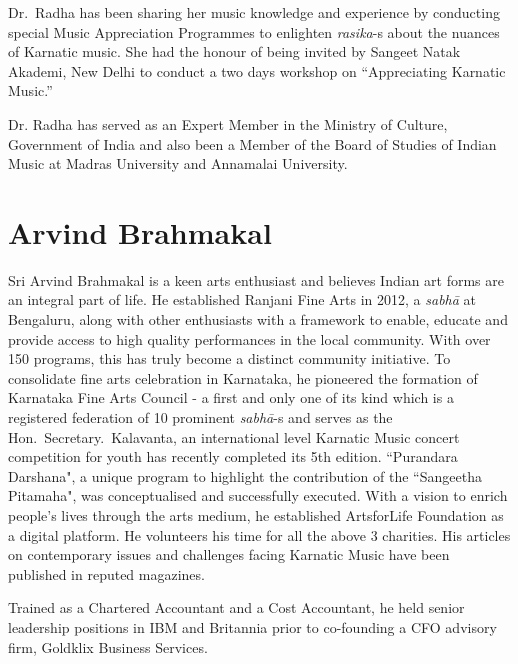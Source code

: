 Dr.~Radha has been sharing her music knowledge and experience by conducting special Music Appreciation Programmes to enlighten \textit{rasika}-s about the nuances of Karnatic music. She had the honour of being invited by Sangeet Natak Akademi, New Delhi to conduct a two days workshop on “Appreciating Karnatic Music.”

Dr. Radha has served as an Expert Member in the Ministry of Culture, Government of India and also been a Member of the Board of Studies of Indian Music at Madras University and Annamalai University.

\vspace{-.3cm}

\section*{Arvind Brahmakal}

\vspace{-.2cm}

Sri Arvind Brahmakal is a keen arts enthusiast and believes Indian art forms are an integral part of life. He established Ranjani Fine Arts in 2012, a \textit{sabhā} at Bengaluru, along with other enthusiasts with a framework to enable, educate and provide access to high quality performances in the local community. With over 150 programs, this has truly become a distinct community initiative. To consolidate fine arts celebration in Karnataka, he pioneered the formation of Karnataka Fine Arts Council - a first and only one of its kind which is a registered federation of 10 prominent \textit{sabhā}-s and serves as the Hon.~Secretary.~Kalavanta, an international level Karnatic Music concert competition for youth has recently completed its 5th edition. ``Purandara Darshana", a unique program to highlight the contribution of the ``Sangeetha Pitamaha", was conceptualised and successfully executed. With a vision to enrich people's lives through the arts medium, he established ArtsforLife Foundation as a digital platform. He volunteers his time for all the above 3 charities. His articles on contemporary issues and challenges facing Karnatic Music have been published in reputed magazines.

\newpage
Trained as a Chartered Accountant and a Cost Accountant, he held senior leadership positions in IBM and Britannia prior to co-founding a CFO advisory firm, Goldklix Business Services.

\vspace{-.3cm}

